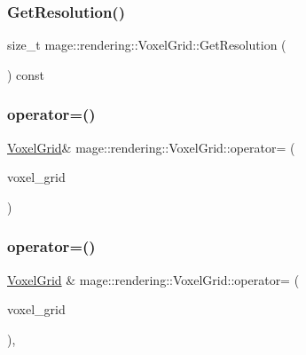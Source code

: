 \subsubsection{\texorpdfstring{Get\+Resolution()}{GetResolution()}}
{\footnotesize\ttfamily size\+\_\+t mage\+::rendering\+::\+Voxel\+Grid\+::\+Get\+Resolution (\begin{DoxyParamCaption}{ }\end{DoxyParamCaption}) const\hspace{0.3cm}{\ttfamily [noexcept]}}

\hypertarget{classmage_1_1rendering_1_1_voxel_grid_a90b94d3a00e365e1a03d1077a5c79a11}{}\label{classmage_1_1rendering_1_1_voxel_grid_a90b94d3a00e365e1a03d1077a5c79a11} 
\subsubsection{\texorpdfstring{operator=()}{operator=()}\hspace{0.1cm}{\footnotesize\ttfamily [1/2]}}
{\footnotesize\ttfamily \hyperlink{classmage_1_1rendering_1_1_voxel_grid}{Voxel\+Grid}\& mage\+::rendering\+::\+Voxel\+Grid\+::operator= (\begin{DoxyParamCaption}\item[{const \hyperlink{classmage_1_1rendering_1_1_voxel_grid}{Voxel\+Grid} \&}]{voxel\+\_\+grid }\end{DoxyParamCaption})\hspace{0.3cm}{\ttfamily [delete]}}

\hypertarget{classmage_1_1rendering_1_1_voxel_grid_a9e0ae3de8c583879a3db8b6d787138ac}{}\label{classmage_1_1rendering_1_1_voxel_grid_a9e0ae3de8c583879a3db8b6d787138ac} 
\subsubsection{\texorpdfstring{operator=()}{operator=()}\hspace{0.1cm}{\footnotesize\ttfamily [2/2]}}
{\footnotesize\ttfamily \hyperlink{classmage_1_1rendering_1_1_voxel_grid}{Voxel\+Grid} \& mage\+::rendering\+::\+Voxel\+Grid\+::operator= (\begin{DoxyParamCaption}\item[{\hyperlink{classmage_1_1rendering_1_1_voxel_grid}{Voxel\+Grid} \&\&}]{voxel\+\_\+grid }\end{DoxyParamCaption})\hspace{0.3cm}{\ttfamily [default]}, {\ttfamily [noexcept]}}

